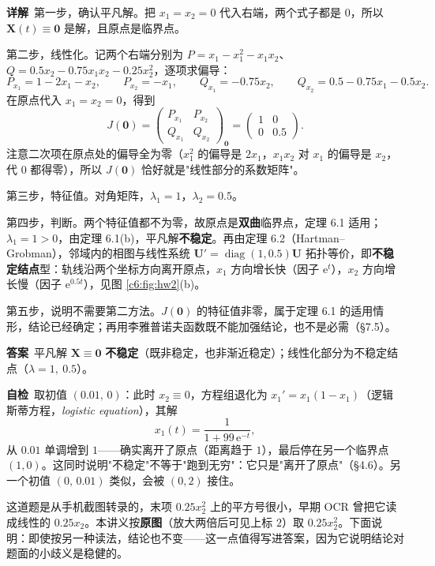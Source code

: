 \documentclass[11pt]{ctexart}
\newcommand{\X}{\mathbf{X}}\newcommand{\Y}{\mathbf{Y}}
\newcommand{\U}{\mathbf{U}}
\newcommand{\Jac}{J}
\newcommand{\EN}[1]{\textcolor{inkgray}{\itshape #1}}
\begin{document}
\textbf{详解}\
第一步，确认平凡解。把 $x_1=x_2=0$ 代入右端，两个式子都是 $0$，所以 $\X(t)\equiv\mathbf{0}$ 是解，且原点是临界点。

第二步，线性化。记两个右端分别为 $P=x_1-x_1^{2}-x_1x_2$、$Q=0.5x_2-0.75x_1x_2-0.25x_2^{2}$，逐项求偏导：
\[
P_{x_1}=1-2x_1-x_2,\qquad P_{x_2}=-x_1,\qquad
Q_{x_1}=-0.75x_2,\qquad Q_{x_2}=0.5-0.75x_1-0.5x_2 .
\]
在原点代入 $x_1=x_2=0$，得到
\[
\Jac(\mathbf{0})=\begin{pmatrix}P_{x_1}&P_{x_2}\\Q_{x_1}&Q_{x_2}\end{pmatrix}_{\mathbf{0}}
=\begin{pmatrix}1&0\\0&0.5\end{pmatrix}.
\]
注意二次项在原点处的偏导全为零（$x_1^{2}$ 的偏导是 $2x_1$，$x_1x_2$ 对 $x_1$ 的偏导是 $x_2$，代 $0$ 都得零），所以 $\Jac(\mathbf{0})$ 恰好就是"线性部分的系数矩阵"。

第三步，特征值。对角矩阵，$\lambda_1=1$，$\lambda_2=0.5$。

第四步，判断。两个特征值都不为零，故原点是\textbf{双曲}临界点，定理 6.1 适用；$\lambda_1=1>0$，由定理 6.1(b)，平凡解\textbf{不稳定}。再由定理 6.2（Hartman--Grobman），邻域内的相图与线性系统 $\U'=\operatorname{diag}(1,0.5)\U$ 拓扑等价，即\textbf{不稳定结点}型：轨线沿两个坐标方向离开原点，$x_1$ 方向增长快（因子 $\mathrm{e}^{t}$），$x_2$ 方向增长慢（因子 $\mathrm{e}^{0.5t}$），见图 \ref{c6:fig:hw2}(b)。

第五步，说明不需要第二方法。$\Jac(\mathbf{0})$ 的特征值非零，属于定理 6.1 的适用情形，结论已经确定；再用李雅普诺夫函数既不能加强结论，也不是必需（§7.5）。

\textbf{答案}\ 平凡解 $\X\equiv\mathbf{0}$ \textbf{不稳定}（既非稳定，也非渐近稳定）；线性化部分为不稳定结点（$\lambda=1,\ 0.5$）。

\textbf{自检}\ 取初值 $(0.01,\,0)$：此时 $x_2\equiv0$，方程组退化为 $x_1'=x_1(1-x_1)$（逻辑斯蒂方程，\EN{logistic equation}），其解
\[
x_1(t)=\frac{1}{1+99\,\mathrm{e}^{-t}},
\]
从 $0.01$ 单调增到 $1$——确实离开了原点（距离趋于 $1$），最后停在另一个临界点 $(1,0)$。这同时说明"不稳定"不等于"跑到无穷"：它只是"离开了原点"（§4.6）。另一个初值 $(0,\,0.01)$ 类似，会被 $(0,2)$ 接住。

\newpage


这道题是从手机截图转录的，末项 $0.25x_2^{2}$ 上的平方号很小，早期 OCR 曾把它读成线性的 $0.25x_2$。本讲义按\textbf{原图}（放大两倍后可见上标 $2$）取 $0.25x_2^{2}$。下面说明：即使按另一种读法，结论也不变——这一点值得写进答案，因为它说明结论对题面的小歧义是稳健的。
\end{document}
